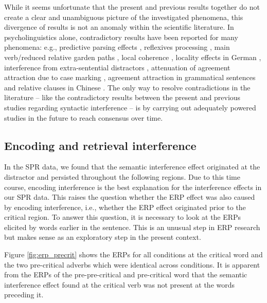 \documentclass[review,preprint,12pt,authoryear,floatsintext]{elsarticle}
\begin{document}
{{While it seems unfortunate that the present and previous results together do not create a clear and unambiguous picture of the investigated phenomena, this divergence of results is not an anomaly within the scientific literature. In psycholinguistics alone, contradictory results have been reported for many phenomena: e.g., predictive parsing effects \citep{nieuwland_etal_2018, Delong_etal_2005}, reflexives processing \citep{jaeger_etal_2020, dillon2013}, main verb/reduced relative garden paths \citep{trueswell1994semantic, ferreira1986independence}, local coherence \citep{taboretal04, lcpaape2023}, locality effects in German \citep{levy&keller_2013, vasishth2018_signficancefilter}, interference from extra-sentential distractors \citep{vandyke_mcelree06, mertzen_repVDM2006}, attenuation of agreement attraction due to case marking \citep{hartsuiker2001_agree, Avetisyan_etal_2020_agree}, agreement attraction in grammatical sentences \citep{wagers2009agrttr, nicenboim} and relative clauses in Chinese \citep{hsiao03, gibsonwu, VasishthetalPLoSOne2013, jaeger2015subject}. The only way to resolve contradictions in the literature -- like the contradictory results between the present and previous studies regarding syntactic interference -- is by carrying out adequately powered studies in the future to reach consensus over time.}\label{not_an_anomaly}

\subsection{Encoding and retrieval interference}
In the SPR data, we found that the semantic interference effect originated at the distractor and persisted throughout the following regions. Due to this time course, encoding interference \citep{Yadavetal2022,hammerly2019grammaticality} is the best explanation for the interference effects in our SPR data. This raises the question whether the ERP effect was also caused by encoding interference, i.e., whether the ERP effect originated prior to the critical region. To answer this question, it is necessary to look at the ERPs elicited by words earlier in the sentence. This is an unusual step in ERP research but makes sense as an exploratory step in the present context. 

Figure \ref{fig:erp_precrit} shows the ERPs for all conditions at the critical word and the two pre-critical adverbs which were identical across conditions. It is apparent from the ERPs of the pre-pre-critical and pre-critical word that the semantic interference effect found at the critical verb was not present at the words preceding it. 

}
\end{document}
